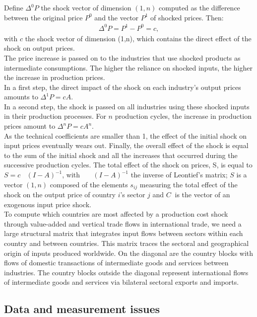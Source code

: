 \documentclass[11pt,a4paper]{article}
\begin{document}
Define ${{\Delta }^{0}}P$ the shock vector of dimension $(1, n)$ computed as the difference between the original price $P^0$ and the vector $P^1$ of shocked prices. Then:
\begin{eqnarray*}
\Delta ^{0}P=P^1-P^0=c, 
\end{eqnarray*}
with $c$ the shock vector of dimension (1,n), which contains the direct effect of the shock on output prices.\\
The price increase is passed on to the industries that use shocked products as intermediate consumptions. The higher the reliance on shocked inputs, the higher the increase in production prices.\\
In a first step, the direct impact of the shock on each industry's output prices amounts to $\Delta^{1}P=cA$.\\
In a second step, the shock is passed on all industries using these shocked inputs in their production processes. For $n$ production cycles, the increase in production prices amount to $\Delta^n P=cA^n$.\\
As the technical coefficients are smaller than 1, the effect of the initial shock on input prices eventually wears out. Finally, the overall effect of the shock is equal to the sum of the initial shock and all the increases that occurred during the successive production cycles. The total effect of the shock on prices, S, is equal to $S=c \!\!~\!\!\text{ }{{\left( I-A \right)}^{-1}}$, with $\text{ }\!\!~\!\!\text{ }{{\left( I-A \right)}^{-1}}$ the inverse of Leontief's matrix; $S$ is a vector $(1, n)$ composed of the elements $s_{ij}$ measuring the total effect of the shock on the output price of country $i$'s sector $j$ and $C~$ is the vector of an exogenous input price shock.\\
To compute which countries are most affected by a production cost shock through value-added and vertical trade flows in international trade, we need a large structural matrix that integrates input flows between sectors within each country and between countries. This matrix traces the sectoral and geographical origin of inputs produced worldwide. On the diagonal are the country blocks with flows of domestic transactions of intermediate goods and services between industries. The country blocks outside the diagonal represent international flows of intermediate goods and services via bilateral sectoral exports and imports. 


\subsection{Data and measurement issues}
\label{subsec:data}
\end{document}
